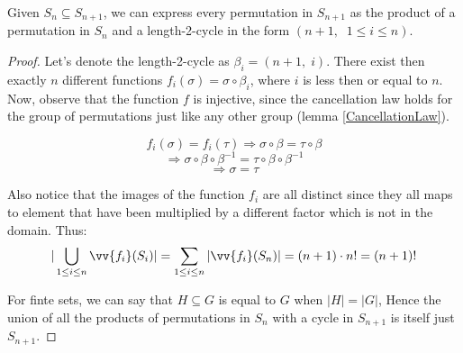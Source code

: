 \begin{lemma}
\label{PermutationsCancellationLaw}
    Given $S_n \subseteq S_{n+1}$, we can express every permutation in $S_{n+1}$ as the 
    product of a permutation in $S_n$ and a length-2-cycle in the form $(n+1,\;\; 1 \leq i \leq n)$.
\end{lemma}  
\begin{proof}
    Let's denote the length-2-cycle as $\beta_{i} = (n+1,\; i)$. There exist then exactly $n$ 
    different functions $f_i(\sigma) = \sigma \circ \beta_{i}$, where $i$ is less then or equal 
    to $n$. \\

    Now, observe that the function $f$ is injective, since the cancellation law holds for
    the group of permutations just like any other group (lemma \ref{CancellationLaw}).

    $$ f_i(\sigma) = f_i(\tau) \Rightarrow \sigma \circ \beta = \tau \circ \beta $$
    $$ \Rightarrow \sigma \circ \beta \circ \beta^{-1} = \tau \circ \beta \circ \beta^{-1} $$
    $$ \Rightarrow \sigma = \tau $$ \vspace{0.2em}

    Also notice that the images of the function $f_i$ are all distinct since they all 
    maps to element that have been multiplied by a different factor which is not in the domain. Thus: \\
    
    $$ |\bigcup_{1 \leq i \leq n} \vv{f_i}(S_i) | = \sum_{1 \leq i \leq n} |\vv{f_i}(S_n)| 
    = (n + 1) \cdot n! = (n+1)! $$ \vspace{0.2em}

    For finte sets, we can say that $H \subseteq G$ is equal to $G$ when $|H| = |G|$, Hence the union 
    of all the products of permutations in $S_n$ with a cycle in $S_{n+1}$ is itself just $S_{n+1}$.
\end{proof} \vspace{0.2em}

